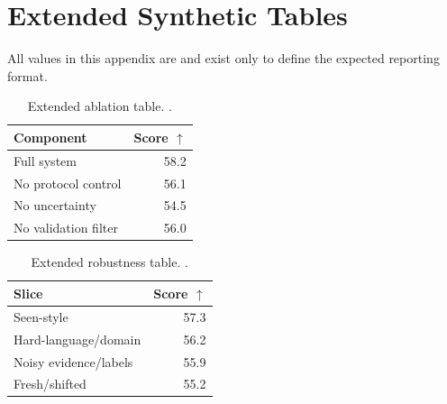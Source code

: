 \section{Extended Synthetic Tables}
    All values in this appendix are \syntheticlabel{} and exist only to define the expected reporting format.

    \begin{table}[t]
    \centering
    \small
    \begin{tabular}{lr}
    \toprule
    Component & Score $\uparrow$ \\
    \midrule
    Full system & 58.2 \\
No protocol control & 56.1 \\
No uncertainty & 54.5 \\
No validation filter & 56.0 \\
    \bottomrule
    \end{tabular}
    \caption{Extended ablation table. \syntheticlabel{}.}
    \end{table}

    \begin{table}[t]
    \centering
    \small
    \begin{tabular}{lr}
    \toprule
    Slice & Score $\uparrow$ \\
    \midrule
    Seen-style & 57.3 \\
Hard-language/domain & 56.2 \\
Noisy evidence/labels & 55.9 \\
Fresh/shifted & 55.2 \\
    \bottomrule
    \end{tabular}
    \caption{Extended robustness table. \syntheticlabel{}.}
    \end{table}
